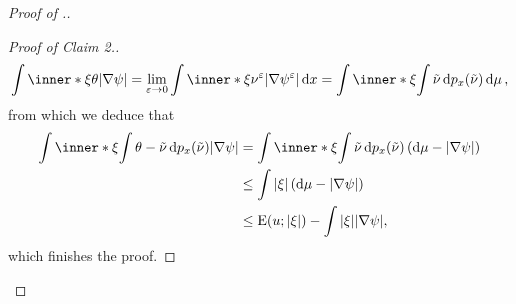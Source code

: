\begin{proof}[Proof of .]
\begin{proof}[Proof of Claim 2.]
\begin{equation*}
			\int
				\inner*{ \xi }{ \theta }
			\abs{ \nabla \psi }
			=
			\lim_{ \varepsilon \to 0 }
				\int
					\inner*{ \xi }{ \nu^{ \varepsilon } }
					\abs{ \nabla \psi^{ \varepsilon } }
				\dd{ x }
			=
			\int
				\inner*{ \xi }{
					\int 
						\tilde{ \nu } 
					\dd{ p_{ x } ( \tilde{ \nu } ) } 
				}
			\dd{ \mu },
		\end{equation*}
		from which we deduce that
		\begin{align*}
			\int
				\inner*{ \xi }{
					\int
						\theta - \tilde{ \nu }
					\dd{ p_{ x } ( \tilde{ \nu } ) }
				}
			\abs{ \nabla \psi }
			& =
			\int
				\inner*{ \xi }{
					\int
						\tilde{ \nu }
					\dd{ p_{ x } ( \tilde{ \nu } ) }
				}
			\left(
				\dd{ \mu } - \abs{ \nabla \psi }
			\right)
			\\
			& \leq
			\int
				\abs{ \xi }
			\left(
				\dd{ \mu } - \abs{ \nabla \psi }
			\right)
			\\
			& \leq
			\energy ( u ; \abs{ \xi } )
			-
			\int
				\abs{ \xi }
			\abs{ \nabla \psi },
		\end{align*}
		which finishes the proof.
	\end{proof}


\end{proof}
